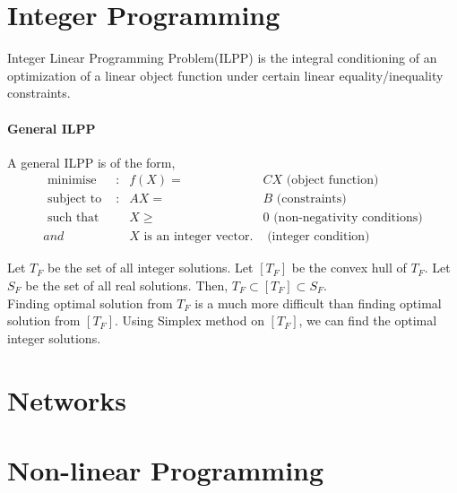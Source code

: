 \section{Integer Programming}
\begin{definition}
	Integer Linear Programming Problem(ILPP) is the integral conditioning of an optimization of a linear object function under certain linear equality/inequality constraints.
\end{definition}

\paragraph{General ILPP}
A general ILPP is of the form,
\begin{align}
	\text{ minimise } & : & f(X) = & CX  \text{ (object function)} \label{eqn:obj} \\
	\text{ subject to } & : & AX = & B \text{ (constraints)}\label{eqn:sub} \\
	\text{ such that } & & X \ge & 0 \text{ (non-negativity conditions)}\label{eqn:positive} \\
	and & & X \text{ is an integer vector}. & \text{ (integer condition) }
\end{align}

\begin{remark}
	Let $T_F$ be the set of all integer solutions.
	Let $[T_F]$ be the convex hull of $T_F$.
	Let $S_F$ be the set of all real solutions.
	Then, $T_F \subset [T_F] \subset S_F$.\\
	
	Finding optimal solution from $T_F$ is a much more difficult than finding optimal solution from $[T_F]$. Using Simplex method on $[T_F]$, we can find the optimal integer solutions.
\end{remark}
\section{Networks}
\section{Non-linear Programming}

